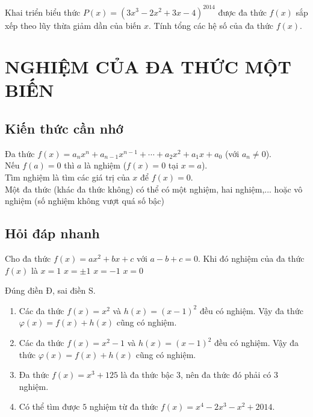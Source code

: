 \begin{bt}%
	Khai triển biểu thức $P(x)=(3x^3-2x^2+3x-4)^{2014}$ được đa thức $f(x)$ sắp xếp theo lũy thừa giảm dần của biến $x$. Tính tổng các hệ số của đa thức $f(x)$.
\end{bt}

\newpage

\section{NGHIỆM CỦA ĐA THỨC MỘT BIẾN}

\subsection{Kiến thức cần nhớ}
Đa thức $f(x)=a_nx^n+a_{n-1}x^{n-1}+\cdots+a_2x^2+a_1x+a_0$ (với $a_n\ne 0$).\\
Nếu $f(a)=0$ thì $a$ là nghiệm ($f(x)=0$ tại $x=a$).\\
Tìm nghiệm là tìm các giá trị của $x$ để $f(x)=0$.\\
Một đa thức (khác đa thức không) có thể có một nghiệm, hai nghiệm,... hoặc vô nghiệm (số nghiệm không vượt quá số bậc)

\subsection{Hỏi đáp nhanh}

\begin{ex}%
	Cho đa thức $f(x)=ax^2+bx+c$ với $a-b+c=0$. Khi đó nghiệm của đa thức $f(x)$ là
	\choice
	{$x=1$}
	{$x=\pm 1$}
	{\True $x=-1$}
	{$x=0$}
\end{ex}

\begin{ex}%
	Đúng điền Đ, sai điền S.
	\begin{enumerate}
		\item {} Các đa thức $f(x)=x^2$ và $h(x)=(x-1)^2$ đều có nghiệm. Vậy đa thức $\varphi (x)=f(x)+h(x)$ cũng có nghiệm.
		\item {} Các đa thức $f(x)=x^2-1$ và $h(x)=(x-1)^2$ đều có nghiệm. Vậy đa thức $\varphi (x)=f(x)+h(x)$ cũng có nghiệm.
		\item {} Đa thức $f(x)=x^3+125$ là đa thức bậc $3$, nên đa thức đó phải có $3$ nghiệm.
		\item {} Có thể tìm được $5$ nghiệm từ đa thức $f(x)=x^4-2x^3-x^2+2014$.
	\end{enumerate}
\end{ex}


